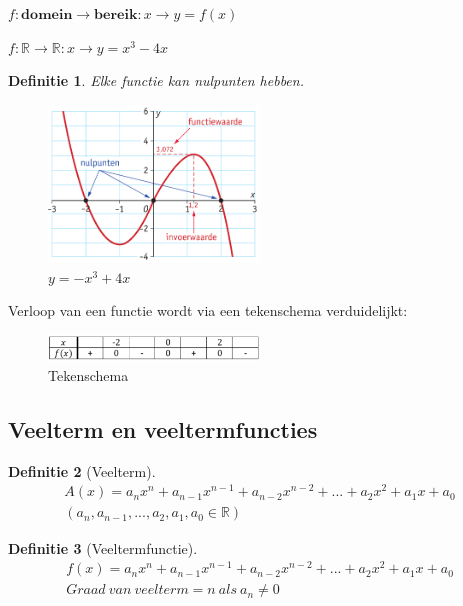 \documentclass{article}
\newtheorem{theorem}{Definitie}[section]
\begin{document}
$f: \mathbf{domein} \rightarrow \mathbf{bereik}: x \rightarrow y = f(x)$

$f: \mathbb{R} \rightarrow \mathbb{R} : x \rightarrow y = x^3 - 4x$

\begin{theorem}
    Elke functie kan nulpunten hebben.
\end{theorem}

\begin{figure}[H]
    \centering
    \includegraphics[width=0.5\textwidth]{functie-nulpunten.png}
    \caption{$y=-x^3 + 4x$}
\end{figure}

Verloop van een functie wordt via een tekenschema verduidelijkt:

\begin{figure}[H]
    \centering
    \includegraphics[width=0.5\textwidth]{functie-tekenschema.png}
    \caption{Tekenschema}
\end{figure}

\subsection{Veelterm en veeltermfuncties}

\begin{theorem}[Veelterm]
\begin{equation}
    \begin{aligned}
        A(x) = a_nx^n + a_{n-1}x^{n-1} + a_{n-2}x^{n-2} + ... + a_{2}x^{2} + a_1x + a_0\\
        (a_n,a_{n-1},...,a_2,a_1,a_0 \in \mathbb{R})
    \end{aligned}
\end{equation}

\end{theorem}

\begin{theorem}[Veeltermfunctie]
\begin{equation}
    \begin{aligned}
        f(x) = a_nx^n + a_{n-1}x^{n-1} + a_{n-2}x^{n-2} + ... + a_{2}x^{2} + a_1x + a_0\\
        Graad\ van\ veelterm = n\ als\ a_n \neq 0
    \end{aligned}
\end{equation}
\end{theorem}
\end{document}
